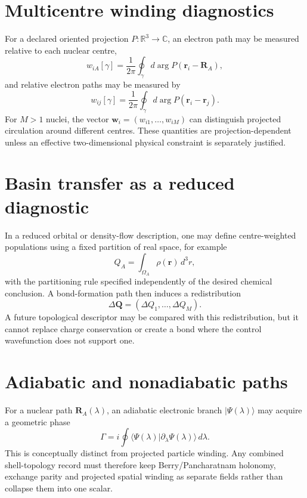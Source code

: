 \section{Multicentre winding diagnostics}
For a declared oriented projection $P:\mathbb R^3\rightarrow\mathbb C$, an electron path may be measured relative to each nuclear centre,
\begin{equation}
w_{iA}[\gamma]=\frac{1}{2\pi}\oint_\gamma d\arg P(\mathbf r_i-\mathbf R_A),
\end{equation}
and relative electron paths may be measured by
\begin{equation}
w_{ij}[\gamma]=\frac{1}{2\pi}\oint_\gamma d\arg P(\mathbf r_i-\mathbf r_j).
\end{equation}
For $M>1$ nuclei, the vector $\mathbf w_i=(w_{i1},\ldots,w_{iM})$ can distinguish projected circulation around different centres.  These quantities are projection-dependent unless an effective two-dimensional physical constraint is separately justified.

\section{Basin transfer as a reduced diagnostic}
In a reduced orbital or density-flow description, one may define centre-weighted populations using a fixed partition of real space, for example
\begin{equation}
Q_A=\int_{\Omega_A}\rho(\mathbf r)\,d^3r,
\end{equation}
with the partitioning rule specified independently of the desired chemical conclusion.  A bond-formation path then induces a redistribution
\begin{equation}
\Delta\mathbf Q=(\Delta Q_1,\ldots,\Delta Q_M).
\end{equation}
A future topological descriptor may be compared with this redistribution, but it cannot replace charge conservation or create a bond where the control wavefunction does not support one.

\section{Adiabatic and nonadiabatic paths}
For a nuclear path $\mathbf R_A(\lambda)$, an adiabatic electronic branch $|\Psi(\lambda)\rangle$ may acquire a geometric phase
\begin{equation}
\Gamma=i\oint\langle\Psi(\lambda)|\partial_\lambda\Psi(\lambda)\rangle\,d\lambda.
\end{equation}
This is conceptually distinct from projected particle winding.  Any combined shell-topology record must therefore keep Berry/Pancharatnam holonomy, exchange parity and projected spatial winding as separate fields rather than collapse them into one scalar.

